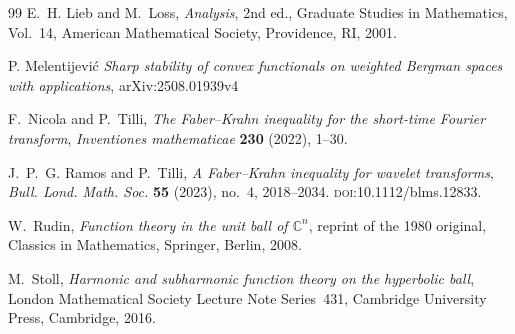 \documentclass[a4paper,10pt]{amsart}
\begin{document}
\begin{thebibliography}{99}
E.~H. Lieb and M.~Loss, \emph{Analysis}, 2nd ed., Graduate Studies in Mathematics, Vol.~14, American Mathematical Society, Providence, RI, 2001.

P. Melentijevi\'c \emph{Sharp stability of convex functionals on weighted Bergman spaces with applications},  arXiv:2508.01939v4


F.~Nicola and P.~Tilli, \emph{The Faber--Krahn inequality for the short-time Fourier transform}, \emph{Inventiones mathematicae} \textbf{230} (2022), 1--30.

J.~P.~G. Ramos and P.~Tilli, \emph{A Faber--Krahn inequality for wavelet transforms}, \emph{Bull. Lond. Math. Soc.} \textbf{55} (2023), no.~4, 2018--2034. \textsc{doi}:10.1112/blms.12833.


W.~Rudin, \emph{Function theory in the unit ball of $\mathbb{C}^n$}, reprint of the 1980 original, Classics in Mathematics, Springer, Berlin, 2008.

M.~Stoll, \emph{Harmonic and subharmonic function theory on the hyperbolic ball}, London Mathematical Society Lecture Note Series~431, Cambridge University Press, Cambridge, 2016.

\end{thebibliography}
\end{document}
